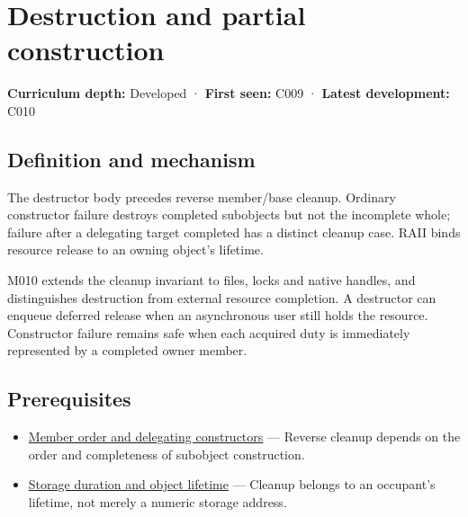 \hypertarget{appendix-9bfe377cef7a}{}\label{referencestart:appendix-9bfe377cef7a}
\section{Destruction and partial construction}\label{appendix-9bfe377cef7a-destruction-and-partial-construction}

\hypertarget{appendix-9bfe377cef7a-destruction-and-partial-construction}{}

\textbf{Curriculum depth:} Developed · \textbf{First seen:} C009 · \textbf{Latest development:} C010

\begin{allmightroledefinition}

\subsection{Definition and mechanism}\label{appendix-9bfe377cef7a-definition-and-mechanism}

\hypertarget{appendix-9bfe377cef7a-definition-and-mechanism}{}

The destructor body precedes reverse member/base cleanup. Ordinary constructor failure destroys completed subobjects but not the incomplete whole; failure after a delegating target completed has a distinct cleanup case. RAII binds resource release to an owning object's lifetime.

\end{allmightroledefinition}

M010 extends the cleanup invariant to files, locks and native handles, and distinguishes destruction from external resource completion. A destructor can enqueue deferred release when an asynchronous user still holds the resource. Constructor failure remains safe when each acquired duty is immediately represented by a completed owner member.

\subsection{Prerequisites}\label{appendix-9bfe377cef7a-prerequisites}

\hypertarget{appendix-9bfe377cef7a-prerequisites}{}

\begin{itemize}
\tightlist
\item
  \hyperref[appendix-3cb49709605a]{Member order and delegating constructors} --- Reverse cleanup depends on the order and completeness of subobject construction.
\item
  \hyperref[appendix-0b104bcba06b]{Storage duration and object lifetime} --- Cleanup belongs to an occupant's lifetime, not merely a numeric storage address.
\end{itemize}

